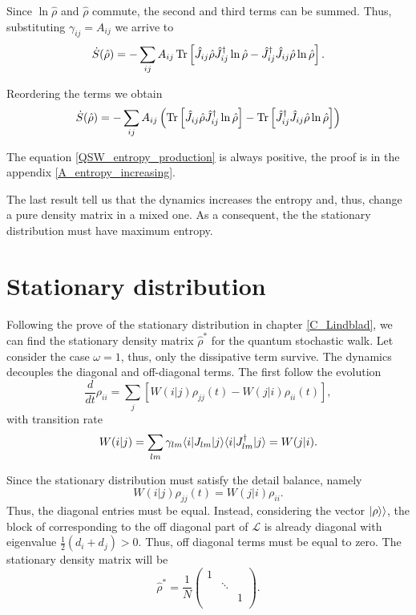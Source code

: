 Since $\ln\hat\rho$ and $\hat\rho$ commute, the second and third terms can be summed. Thus, substituting $\gamma_{ij} = A_{ij}$ we arrive to
\begin{equation}
        \dot S(\hat\rho) = -\sum_{ij}A_{ij}\operatorname{Tr}\left[\hat J_{ij} \hat\rho\hat J_{ij}^\dagger\ln\hat\rho -\hat J_{ij}^\dagger \hat J_{ij}\hat\rho\ln\hat\rho\right].
\end{equation}

Reordering the terms we obtain
\begin{equation}\label{QSW_entropy_production}
    \dot S(\hat\rho) =  -\sum_{ij}A_{ij}\left(\operatorname{Tr}\left[\hat J_{ij} \hat\rho\hat J_{ij}^\dagger\ln\hat\rho\right]-\operatorname{Tr}\left[\hat J_{ij}^\dagger \hat J_{ij}\hat\rho\ln\hat\rho\right]\right)
\end{equation}

The equation \eqref{QSW_entropy_production} is always positive, the proof is in the appendix \ref{A_entropy_increasing}. 

The last result tell us that the dynamics increases the entropy and, thus, change a pure density matrix in a mixed one.
As a consequent, the the stationary distribution must have maximum entropy.

\section{Stationary distribution}

Following the prove of the stationary distribution in chapter \ref{C_Lindblad}, we can find the stationary density matrix $\hat\rho^*$ for the quantum stochastic walk.
Let consider the case $\omega = 1$, thus, only the dissipative term survive.
The dynamics decouples the diagonal and off-diagonal terms. The first follow the evolution 
\begin{equation}
    \frac{d}{dt}\rho_{ii} = \sum_j\left[W(i|j)\rho_{jj}(t) - W(j|i)\rho_{ii}(t)\right],
\end{equation}
with transition rate
\begin{equation}
    W(i|j) = \sum_{lm} \gamma_{lm}\langle i\rvert J_{lm}\lvert j\rangle\langle i\rvert J_{lm}^\dagger\lvert j\rangle = W(j|i).
\end{equation}

Since the stationary distribution must satisfy the detail balance, namely
\begin{equation}
    W(i|j)\rho_{jj}(t) = W(j|i)\rho_{ii}.
\end{equation}
Thus, the diagonal entries must be equal. 
Instead, considering the vector $\lvert\rho\rangle\rangle$, the block of corresponding to the off diagonal part of $\mathcal{L}$ is already diagonal with eigenvalue $\frac{1}{2}(d_i + d_j)>0$. Thus, off diagonal terms must be equal to zero.
The stationary density matrix will be
\begin{equation}
    \hat\rho^* = \frac{1}{N}\begin{pmatrix}
        1&&\\
        &\ddots&\\
        &&1\\
    \end{pmatrix}.
\end{equation}

